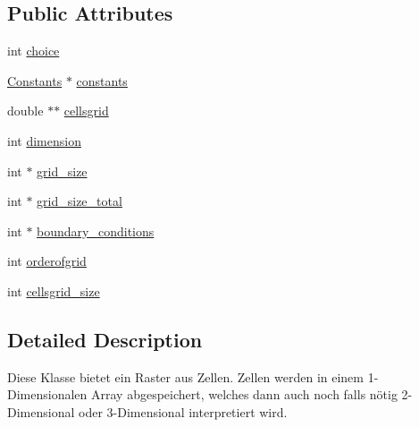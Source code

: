 \subsection*{Public Attributes}
\begin{DoxyCompactItemize}
\item 
int \hyperlink{classGrid_af55897b809ffd9733f6723c8a23d89a5}{choice}
\item 
\hyperlink{classConstants}{Constants} $\ast$ \hyperlink{classGrid_a9e529cbb3ec0b42c8b232be05923a030}{constants}
\item 
double $\ast$$\ast$ \hyperlink{classGrid_aedb9b7d5ce1139730dc73a2f9e0e6edc}{cellsgrid}
\item 
int \hyperlink{classGrid_a6970f8edab2f84c576fc335f6d023f95}{dimension}
\item 
int $\ast$ \hyperlink{classGrid_a7b4eea4e828ebda3ebdfe78b2f9a14d2}{grid\-\_\-size}
\item 
int $\ast$ \hyperlink{classGrid_adbf3823ea45f6e5ae9210d44fbc7e79a}{grid\-\_\-size\-\_\-total}
\item 
int $\ast$ \hyperlink{classGrid_a68bd279fd3b1cee412e436b1f3848225}{boundary\-\_\-conditions}
\item 
int \hyperlink{classGrid_a599c5aadae9322d115d974cb395a83bf}{orderofgrid}
\item 
int \hyperlink{classGrid_a2f725f73b6290e8c8527a6566ef07895}{cellsgrid\-\_\-size}
\end{DoxyCompactItemize}


\subsection{Detailed Description}
Diese Klasse bietet ein Raster aus Zellen. Zellen werden in einem 1-\/\-Dimensionalen Array abgespeichert, welches dann auch noch falls nötig 2-\/\-Dimensional oder 3-\/\-Dimensional interpretiert wird. 

